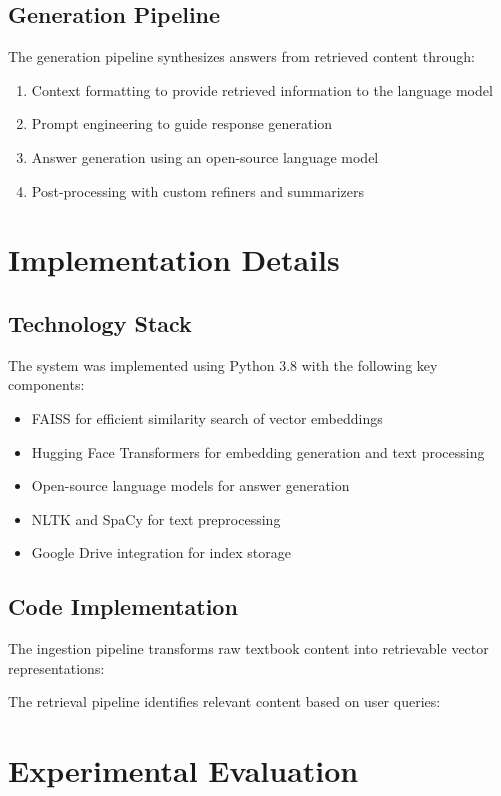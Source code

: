 \documentclass[10pt,conference]{IEEEtran}
\begin{document}
\subsection{Generation Pipeline}
The generation pipeline synthesizes answers from retrieved content through:

\begin{enumerate}
    \item Context formatting to provide retrieved information to the language model
    \item Prompt engineering to guide response generation
    \item Answer generation using an open-source language model
    \item Post-processing with custom refiners and summarizers
\end{enumerate}

\section{Implementation Details}
\subsection{Technology Stack}
The system was implemented using Python 3.8 with the following key components:
\begin{itemize}
    \item FAISS for efficient similarity search of vector embeddings
    \item Hugging Face Transformers for embedding generation and text processing
    \item Open-source language models for answer generation
    \item NLTK and SpaCy for text preprocessing
    \item Google Drive integration for index storage
\end{itemize}

\subsection{Code Implementation}
The ingestion pipeline transforms raw textbook content into retrievable vector representations:


The retrieval pipeline identifies relevant content based on user queries:



\section{Experimental Evaluation}
\end{document}
